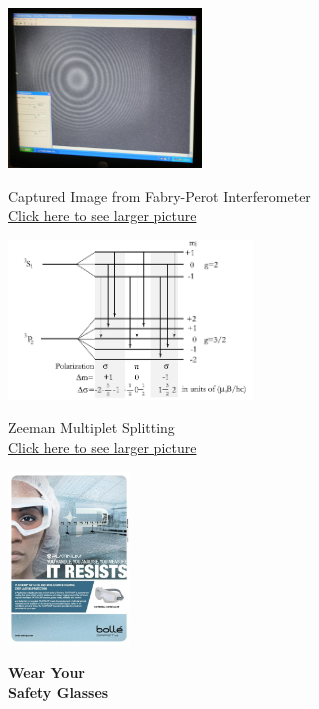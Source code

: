 \documentclass{../lab}
\begin{document}
\begin{figure}[H]
\captionsetup{justification=centering}
\centering
  \href{http://experimentationlab.berkeley.edu/sites/default/files/images/Atm_5.jpg}{\includegraphics[height=120pt,keepaspectratio]{images/Atm_5.jpg}}
  \caption{Captured Image from Fabry-Perot Interferometer \\
  \href{http://experimentationlab.berkeley.edu/sites/default/files/images/Atm_5.jpg}{Click here to see larger picture}}
  \label{fig:ImagedFringes}
\endminipage\hfill
{}
\centering
  \href{http://experimentationlab.berkeley.edu/sites/default/files/images/Atm1image003.png}{\includegraphics[height=120pt,keepaspectratio]{images/Atm1image003.png}}
  \caption{Zeeman Multiplet Splitting \\
  \href{http://experimentationlab.berkeley.edu/sites/default/files/images/Atm1image003.png}{Click here to see larger picture}}
  \label{fig:SafetyGlasses}
\endminipage\hfill
{}
\centering
  \href{http://experimentationlab.berkeley.edu/sites/default/files/upimages/3_eye-wear-face.jpg}{\includegraphics[height=130pt,keepaspectratio]{images/3_eye-wear-face.jpg}}
  \caption{\textbf{Wear Your \\ Safety Glasses}}
\endminipage
\end{figure}
\end{document}
